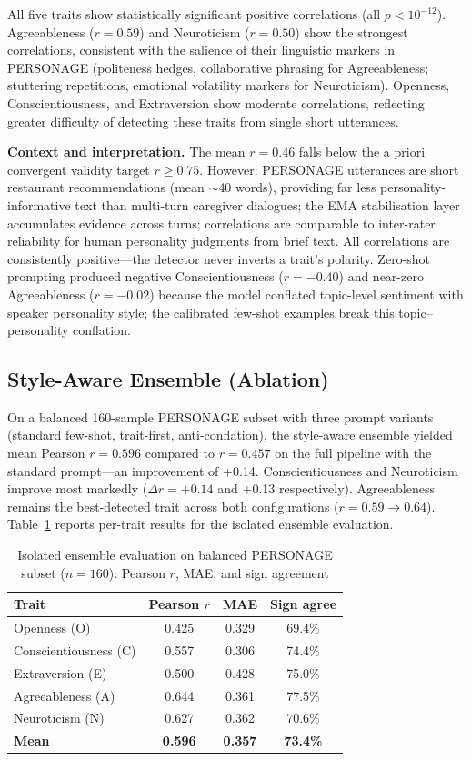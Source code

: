 \documentclass[10pt,a4paper]{report}
\begin{document}
All five traits show statistically significant positive correlations (all $p < 10^{-12}$). Agreeableness ($r = 0.59$) and Neuroticism ($r = 0.50$) show the strongest correlations, consistent with the salience of their linguistic markers in PERSONAGE (politeness hedges, collaborative phrasing for Agreeableness; stuttering repetitions, emotional volatility markers for Neuroticism). Openness, Conscientiousness, and Extraversion show moderate correlations, reflecting greater difficulty of detecting these traits from single short utterances.

\textbf{Context and interpretation.} The mean $r = 0.46$ falls below the a priori convergent validity target $r \geq 0.75$. However: PERSONAGE utterances are short restaurant recommendations (mean $\sim$40 words), providing far less personality-informative text than multi-turn caregiver dialogues; the EMA stabilisation layer accumulates evidence across turns; correlations are comparable to inter-rater reliability for human personality judgments from brief text. All correlations are consistently positive---the detector never inverts a trait's polarity. Zero-shot prompting produced negative Conscientiousness ($r = -0.40$) and near-zero Agreeableness ($r = -0.02$) because the model conflated topic-level sentiment with speaker personality style; the calibrated few-shot examples break this topic--personality conflation.

\subsection{Style-Aware Ensemble (Ablation)}

On a balanced 160-sample PERSONAGE subset with three prompt variants (standard few-shot, trait-first, anti-conflation), the style-aware ensemble yielded mean Pearson $r = 0.596$ compared to $r = 0.457$ on the full pipeline with the standard prompt---an improvement of +0.14. Conscientiousness and Neuroticism improve most markedly ($\Delta r = +0.14$ and +0.13 respectively). Agreeableness remains the best-detected trait across both configurations ($r = 0.59 \to 0.64$). Table~\ref{tab:ensemble} reports per-trait results for the isolated ensemble evaluation.

\begin{table}[H]
\centering\small
\caption{Isolated ensemble evaluation on balanced PERSONAGE subset ($n = 160$): Pearson $r$, MAE, and sign agreement}
\label{tab:ensemble}
\begin{tabular}{@{}lccc@{}}
\toprule
Trait & Pearson $r$ & MAE & Sign agree \\
\midrule
Openness (O) & 0.425 & 0.329 & 69.4\% \\
Conscientiousness (C) & 0.557 & 0.306 & 74.4\% \\
Extraversion (E) & 0.500 & 0.428 & 75.0\% \\
Agreeableness (A) & 0.644 & 0.361 & 77.5\% \\
Neuroticism (N) & 0.627 & 0.362 & 70.6\% \\
\textbf{Mean} & \textbf{0.596} & \textbf{0.357} & \textbf{73.4\%} \\
\bottomrule
\end{tabular}
\end{table}
\end{document}
